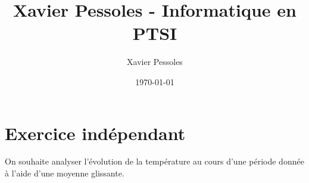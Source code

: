 \documentclass[
	fontsize=10pt, %
	twoside=true, %
]{kaobook}
\newcommand{\repRel}{../../../..}
\newcommand{\repStyle}{\repRel/Style}
\begin{document}

\titlehead{Xavier Pessoles - Informatique en PTSI}
\title[Xavier Pessoles - Informatique en PTSI]{Xavier Pessoles - Informatique en PTSI}
\author[XP]{Xavier Pessoles}
\date{\today}


\begingroup %
\endgroup

%
\mainmatter %
%
%
%
%


\setcounter{margintocdepth}{\sectiontocdepth}
\marginlayout
\graphicspath{{\repStyle/png}}

\pagestyle{xp.scrheadings}


%



\newcommand{\repExo}{Application_01_ROV}
\newcommand{\nomExo}{Application_01_ROV}

\livrettrue %
\livrettrue
\colletrue


\renewcommand{\repExo}{\repRel/Informatique/Exercices/S1_03_UtilisationModules/}
\renewcommand{\nomExo}{02_MarcheAutoEvitante}
\graphicspath{{\repStyle/png}{\repExo\nomExo/images}}


\section*{Exercice indépendant}
On souhaite analyser l'évolution de la température au cours
d'une période donnée à l'aide d'une moyenne glissante.
\end{document}
